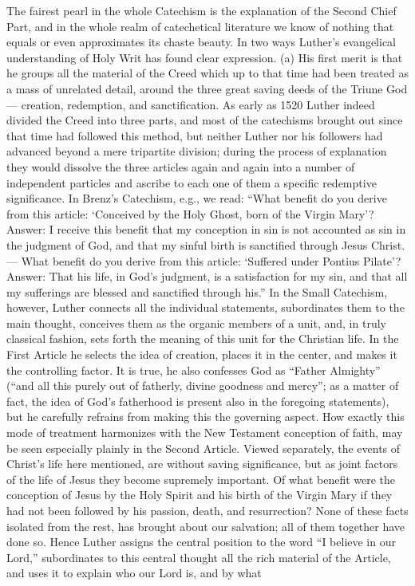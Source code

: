 The fairest pearl in the whole Catechism is the explanation of the Second Chief Part, and in the whole realm of catechetical literature we know of nothing that equals or even approximates its chaste beauty. In two ways Luther’s evangelical understanding of Holy Writ has found clear expression. (a) His first merit is that he groups all the material of the Creed which up to that time had been treated as a mass of unrelated detail, around the three great saving deeds of the Triune God — creation, redemption, and sanctification. As early as 1520 Luther indeed divided the Creed into three parts, and most of the catechisms brought out since that time had followed this method, but neither Luther nor his followers had advanced beyond a mere tripartite division; during the process of explanation they would dissolve the three articles again and again into a number of independent particles and ascribe to each one of them a specific redemptive
significance. In Brenz’s Catechism, e.g., we read: “What benefit do you derive from this article: ‘Conceived by the Holy Ghost, born of the Virgin Mary’? Answer: I receive this benefit that my conception in sin is not accounted as sin in the judgment of God, and that my sinful birth is sanctified through Jesus Christ. — What benefit do you derive from this article: ‘Suffered under Pontius Pilate’? Answer: That his life, in God’s judgment, is a satisfaction for my sin, and that all my sufferings are blessed and sanctified through his.” In the Small Catechism, however, Luther connects all the individual statements, subordinates them to the main thought, conceives them as the organic members of a unit, and, in truly classical fashion, sets forth the meaning of this unit for the Christian life. In the First Article he selects the idea of creation, places it in the center, and makes it the controlling factor. It is true, he also confesses God as “Father Almighty” (“and all this purely out of fatherly, divine goodness and mercy”; as a matter of fact, the idea of God’s fatherhood is present also in the foregoing statements), but he carefully refrains from making this the governing aspect. How exactly this mode of treatment harmonizes with the New Testament conception of faith, may be seen especially plainly in the Second Article. Viewed separately, the events of Christ’s life here mentioned, are without saving significance, but as joint factors of the life of Jesus they become supremely important. Of what benefit were the conception of Jesus by the Holy Spirit and his birth of the Virgin Mary if they had not been followed by his passion, death, and resurrection? None of these facts isolated from the rest, has brought about our salvation; all of them together have done so. Hence Luther assigns the central position to the word “I believe in our Lord,” subordinates to this central thought all the rich material of the Article, and uses it to explain who our Lord is, and by what
